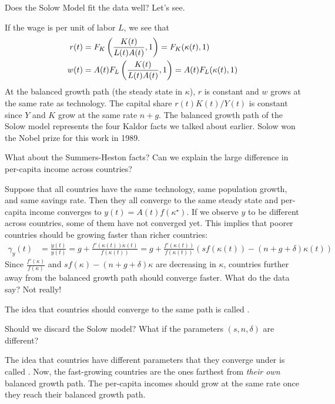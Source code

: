 \documentclass[10pt]{article}
\begin{document}
\begin{question}
	Does the Solow Model fit the data well? Let's see.
\end{question}
\begin{example}
	If the wage is per unit of labor $L$, we see that
	\begin{align*}
		r(t) &= F_K \left( \frac{K(t)}{L(t)A(t)},1 \right) = F_K(\kappa(t),1) \\
		w(t) &= A(t) F_L\left( \frac{K(t)}{L(t)A(t)},1 \right) = A(t) F_L(\kappa(t),1)
	\end{align*}
	At the balanced growth path (\ie the steady state in $\kappa$), $r$ is constant and $w$ grows at the same rate as technology. The capital share $r(t) K(t) / Y(t)$ is constant since $Y$ and $K$ grow at the same rate $n + g$. The balanced growth path of the Solow model represents the four Kaldor facts we talked about earlier. Solow won the Nobel prize for this work in 1989.
\end{example}
\begin{question}
	What about the Summers-Heston facts? Can we explain the large difference in per-capita income across countries?
\end{question}
\begin{answer}
	Suppose that all countries have the same technology, same population growth, and same savings rate. Then they all converge to the same steady state and per-capita income converges to $y(t) = A(t) f(\kappa^\star)$. If we observe $y$ to be different across countries, some of them have not converged yet. This implies that poorer countries should be growing faster than richer countries:
	\begin{align*}
		\gamma_y(t) &= \frac{\dot{y}(t)}{y(t)} = g + \frac{f'(\kappa(t))\dot{\kappa}(t)}{f(\kappa(t))} = g + \frac{f'(\kappa(t))}{f(\kappa(t))} (sf(\kappa(t)) - (n + g + \delta)\kappa(t))
	\end{align*}
	Since $\frac{f'(\kappa)}{f(\kappa)}$ and $sf(\kappa) - (n + g + \delta)\kappa$ are decreasing in $\kappa$, countries further away from the balanced growth path should converge faster. What do the data say? Not really!
\end{answer}

\begin{definition}
	The idea that countries should converge to the same path is called .
\end{definition}
\begin{question}
	Should we discard the Solow model? What if the parameters $(s,n,\delta)$ are different?
\end{question}
\begin{definition}
	The idea that countries have different parameters that they converge under is called . Now, the fast-growing countries are the ones farthest from \emph{their own} balanced growth path. The per-capita incomes should grow at the same rate once they reach their balanced growth path.
\end{definition}
\end{document}
